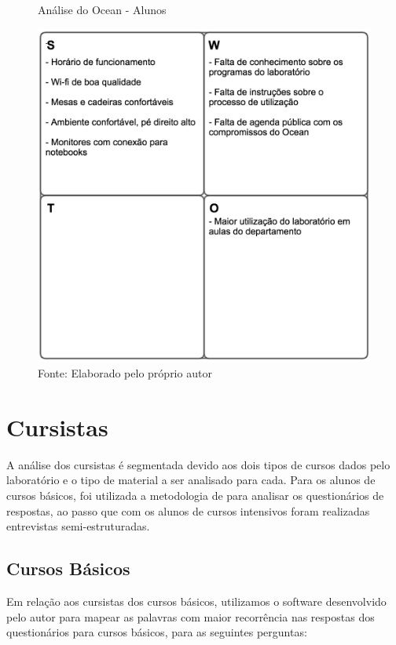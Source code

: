 \begin{figure}[H]
\caption{Análise do Ocean - Alunos}
\centerline{\includegraphics[scale=0.75]{img/alunosswot}}
\label{fig:swotalunos}
\caption* {Fonte: Elaborado pelo próprio autor}
\end{figure}

\section{Cursistas}

A análise dos cursistas é segmentada devido aos dois tipos de cursos dados pelo laboratório e o tipo de material a ser analisado para cada. Para os alunos de cursos básicos, foi utilizada a metodologia de  para analisar os questionários de respostas, ao passo que com os alunos de cursos intensivos foram realizadas entrevistas semi-estruturadas.

\subsection{Cursos Básicos}

Em relação aos cursistas dos cursos básicos, utilizamos o software desenvolvido pelo autor para mapear as palavras com maior recorrência nas respostas dos questionários para cursos básicos, para as seguintes perguntas:

